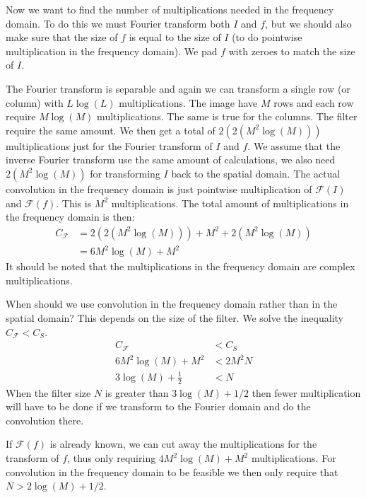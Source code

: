 \documentclass[a4paper, 10pt, final]{article}
\begin{document}
Now we want to find the number of multiplications needed in the
frequency domain. To do this we must Fourier transform both $I$ and
$f$, but we should also make sure that the size of $f$ is equal to the
size of $I$ (to do pointwise multiplication in the frequency domain). We
pad $f$ with zeroes to match the size of $I$.

The Fourier transform is separable and again we can transform a single
row (or column) with $L\log(L)$ multiplications. The image have $M$ rows
and each row require $M\log(M)$ multiplications. The same is true for
the columns. The filter require the same amount. We then get a total of
$2(2(M^2\log(M)))$ multiplications just for the Fourier transform of $I$
and $f$. We assume that the inverse Fourier transform use the same
amount of calculations, we also need $2(M^2\log(M))$ for transforming
$I$ back to the spatial domain. The actual convolution in the frequency
domain is just pointwise multiplication of $\mathcal{F}(I)$ and
$\mathcal{F}(f)$. This is $M^2$ multiplications. The total amount of
multiplications in the frequency domain is then:
\begin{align}
    C_{\mathcal{F}} & = 2(2(M^2\log(M))) + M^2 + 2(M^2\log(M))\\
    & = 6M^2\log(M) + M^2
\end{align}
It should be noted that the multiplications in the frequency domain are
complex multiplications.

When should we use convolution in the frequency domain rather than in
the spatial domain? This depends on the size of the filter. We solve the
inequality $C_{\mathcal{F}} < C_S$.
\begin{align}
    C_{\mathcal{F}} & < C_S\\
    6M^2\log(M) + M^2 & < 2M^2N\\
    3\log(M) + \frac{1}{2} & < N
\end{align}
When the filter size $N$ is greater than $3\log(M) + 1/2$ then fewer
multiplication will have to be done if we transform to the Fourier
domain and do the convolution there.

If $\mathcal{F}(f)$ is already known, we can cut away the
multiplications for the transform of $f$, thus only requiring
$4M^2\log(M) + M^2$ multiplications. For convolution in the frequency
domain to be feasible we then only require that $N > 2\log(M) + 1/2$.
\end{document}
